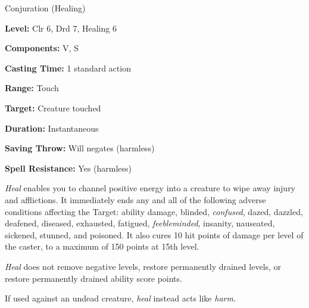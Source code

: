 
Conjuration (Healing)

\textbf{Level:} Clr 6, Drd 7, Healing 6

\textbf{Components:} V, S

\textbf{Casting Time:} 1 standard action

\textbf{Range:} Touch

\textbf{Target:} Creature touched

\textbf{Duration:} Instantaneous

\textbf{Saving Throw:} Will negates (harmless)

\textbf{Spell Resistance:} Yes (harmless)

\textit{Heal} enables you to channel positive energy into a creature to wipe away 
injury and afflictions. It immediately ends any and all of the following adverse 
conditions affecting the Target: ability damage, blinded, \textit{confused}, dazed, 
dazzled, deafened, diseased, exhausted, fatigued, \textit{feebleminded}, insanity, 
nauseated, sickened, stunned, and poisoned. It also cures 10 hit points of damage 
per level of the caster, to a maximum of 150 points at 15th level.

\textit{Heal} does not remove negative levels, restore permanently drained levels, 
or restore permanently drained ability score points.

If used against an undead creature, \textit{heal} instead acts like \textit{harm}.

